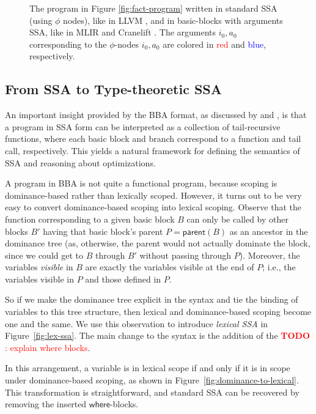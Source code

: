 \documentclass[acmsmall,screen,review]{acmart}
\newcounter{todos}
\newcommand{\todo}[1]{\stepcounter{todos} \textcolor{red}{\textbf{TODO \arabic{todos}}: #1}}
\newcommand{\ms}[1]{\ensuremath{\mathsf{#1}}}
\begin{document}
\begin{figure}
  \caption{
    The program in Figure \ref{fig:fact-program} written in standard SSA (using $\phi$ nodes),
    like in LLVM \cite{llvm}, and in basic-blocks with arguments SSA, like in MLIR \cite{mlir} and
    Cranelift \cite{cranelift}. The arguments $i_0, a_0$ corresponding to the $\phi$-nodes $i_0,
    a_0$ are colored in \textcolor{red}{red} and \textcolor{blue}{blue}, respectively.
  }
  \Description{}
\end{figure}

\subsection{From SSA to Type-theoretic SSA}


An important insight provided by the BBA format, as discussed by \citet{appel-ssa} and
\citet{kelsey-95-cps}, is that a program in SSA form can be interpreted as a collection
of tail-recursive functions, where each basic block and branch correspond to a function and tail
call, respectively. This yields a natural framework for defining the semantics of SSA and reasoning
about optimizations.

A program in BBA is not quite a functional program, because scoping is dominance-based rather
than lexically scoped. However, it turns out to be very easy to convert dominance-based scoping
into lexical scoping. Observe that the function corresponding to
a given basic block $B$ can only be called by other blocks $B'$ having that basic block's parent $P
= \ms{parent}(B)$ as an ancestor in the dominance tree (as, otherwise, the parent would not actually
dominate the block, since we could get to $B$ through $B'$ without passing through $P$). Moreover,
the variables \emph{visible} in $B$ are exactly the variables visible at the end of $P$; i.e., the
variables visible in $P$ and those defined in $P$.

So if we make the dominance tree explicit in the syntax and tie the binding of variables to this
tree structure, then lexical and dominance-based scoping become one and the same. We use this
observation to introduce \emph{lexical SSA} in Figure~\ref{fig:lex-ssa}. The main change to the
syntax is the addition of the \todo{explain where blocks}. 

In this arrangement, a variable is in lexical scope if and only if it is in scope
under dominance-based scoping, as shown in Figure~\ref{fig:dominance-to-lexical}. This
transformation is straightforward, and standard SSA can be recovered by removing the inserted
\ms{where}-blocks.
\end{document}
